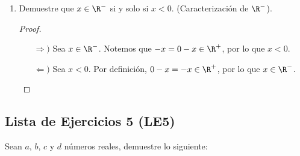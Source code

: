 \begin{enumerate}[label=\alph*)]
 \item Demuestre que $x\in \R^-$ si y solo si $x<0$. (Caracterización de $\R^-$).
 \begin{proof}\leavevmode
 \begin{itemize}
 \item[$\Rightarrow)$] Sea $x\in \R^-$. Notemos que $-x=0-x\in \R^+$, por lo que $x<0$.
 \item[$\Leftarrow)$] Sea $x<0$. Por definición, $0-x=-x\in \R^+$, por lo que $x\in \R^-$. \qedhere
 \end{itemize}
 \end{proof}
\end{enumerate}

\clearpage
\pagebreak

\subsection*{Lista de Ejercicios 5 (LE5)}
Sean $a$, $b$, $c$ y $d$ números reales, demuestre lo siguiente:
